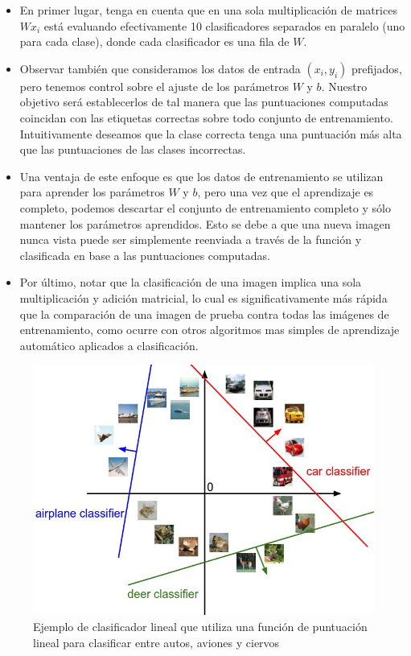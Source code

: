 \documentclass[a4paper,11pt,spanish]{book}
\begin{document}
	  \begin{itemize}
	   \item En primer lugar, tenga en cuenta que en una sola multiplicación de matrices $Wx_{i}$ está evaluando efectivamente 10 clasificadores separados en paralelo (uno para cada clase),
	      donde cada clasificador es una fila de $W$.
	   \item Observar también que consideramos los datos de entrada $(x_{i}, y_{i})$  prefijados, pero tenemos control sobre el ajuste de los parámetros $W$ y $b$.
		 Nuestro objetivo será establecerlos de tal manera que las puntuaciones computadas coincidan con las etiquetas correctas sobre todo conjunto de entrenamiento.
		 Intuitivamente deseamos que la clase correcta tenga una puntuación más alta que las puntuaciones de las clases incorrectas.
	   \item Una ventaja de este enfoque es que los datos de entrenamiento se utilizan para aprender los parámetros $W$ y $b$, pero una vez que el aprendizaje es completo,
		podemos descartar el conjunto de entrenamiento completo y sólo mantener los parámetros aprendidos. Esto se debe a que una nueva imagen nunca vista puede ser
		simplemente reenviada a través de la función y clasificada en base a las puntuaciones computadas.
	  \item Por último, notar que la clasificación de una imagen implica una sola multiplicación y adición matricial, lo cual es significativamente más rápida que la comparación
		de una imagen de prueba contra todas las imágenes de entrenamiento, como ocurre con otros algoritmos mas simples de aprendizaje automático aplicados a clasificación.
	  \end{itemize}
	  \begin{figure}[h]
	    \includegraphics[scale=0.5]{./img/stanford_linear_class.jpeg}
	    \caption{Ejemplo de clasificador lineal que utiliza una función de puntuación lineal para clasificar entre autos, aviones y ciervos}
	    \label{fig:figure2}
	  \end{figure}
\end{document}
